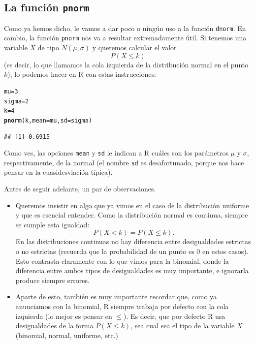 \documentclass[10pt,a4paper]{article}\usepackage[]{graphicx}\usepackage[]{color}
\makeatletter
\newcommand{\hlnum}[1]{\textcolor[rgb]{0.686,0.059,0.569}{#1}}%
\newcommand{\hlstd}[1]{\textcolor[rgb]{0.345,0.345,0.345}{#1}}%
\newcommand{\hlkwb}[1]{\textcolor[rgb]{0.69,0.353,0.396}{#1}}%
\newcommand{\hlkwc}[1]{\textcolor[rgb]{0.333,0.667,0.333}{#1}}%
\newcommand{\hlkwd}[1]{\textcolor[rgb]{0.737,0.353,0.396}{\textbf{#1}}}%
\newenvironment{kframe}{%
 \def\at@end@of@kframe{}%
 \ifinner\ifhmode%
  \def\at@end@of@kframe{\end{minipage}}%
  \begin{minipage}{\columnwidth}%
 \fi\fi%
 \def\FrameCommand##1{\hskip\@totalleftmargin \hskip-\fboxsep
 \colorbox{shadecolor}{##1}\hskip-\fboxsep
     \hskip-\linewidth \hskip-\@totalleftmargin \hskip\columnwidth}%
 \MakeFramed {\advance\hsize-\width
   \@totalleftmargin\z@ \linewidth\hsize
   \@setminipage}}%
 {\par\unskip\endMakeFramed%
 \at@end@of@kframe}
\newenvironment{knitrout}{}{} %
\newcounter{cont01}
\makeatother
\begin{document}
\subsection{La función {\tt pnorm}}
\label{tut05:subsec:pnorm}

Como ya hemos dicho, le vamos a dar poco o ningún uso a la función {\tt dnorm}. En cambio, la función {\tt pnorm} nos va a resultar extremadamente útil. Si tenemos una variable $X$ de tipo $N(\mu,\sigma)$ y queremos calcular el valor
\[P(X\leq k)\]
(es decir, lo que llamamos la cola izquierda de la distribución normal en el punto $k$), lo podemos hacer en R con estas instrucciones:

\begin{knitrout}
\color{fgcolor}\begin{kframe}
\begin{alltt}
\hlstd{mu} \hlkwb{=} \hlnum{3}
\hlstd{sigma} \hlkwb{=} \hlnum{2}
\hlstd{k} \hlkwb{=} \hlnum{4}
\hlkwd{pnorm}\hlstd{(k,} \hlkwc{mean}\hlstd{=mu,} \hlkwc{sd}\hlstd{=sigma)}
\end{alltt}
\begin{verbatim}
## [1] 0.6915
\end{verbatim}
\end{kframe}
\end{knitrout}
Como ves, las opciones {\tt mean} y {\tt sd} le indican a R cuáles son los parámetros $\mu$ y $\sigma$, respectivamente, de la normal (el nombre {\tt sd} es desafortunado, porque nos hace pensar en la cuasidesviación típica).

Antes de seguir adelante, un par de observaciones.
\begin{itemize}
  \item Queremos insistir en algo que ya vimos en el caso de la distribución uniforme y que es esencial entender. Como la distribución normal es continua, {\sf siempre se cumple esta igualdad:}
      \[P(X<k) = P(X\leq k).\]
      En las distribuciones continuas no hay diferencia entre desigualdades estrictas o no estrictas (recuerda que la probabilidad de un punto es $0$ en estos casos). Esto contrasta claramente con lo que vimos para la binomial, donde la diferencia entre ambos tipos de desigualdades es muy importante, e ignorarla produce siempre errores.

  \item Aparte de esto, también {\sf es muy importante recordar que, como ya anunciamos con la binomial, R siempre trabaja por defecto con la cola izquierda (lo mejor es pensar en $\leq$).} Es decir, que por defecto R usa desigualdades de la forma $P(X\leq k)$, sea cual sea el tipo de la variable $X$ (binomial, normal, uniforme, etc.)
\end{itemize}
\end{document}
